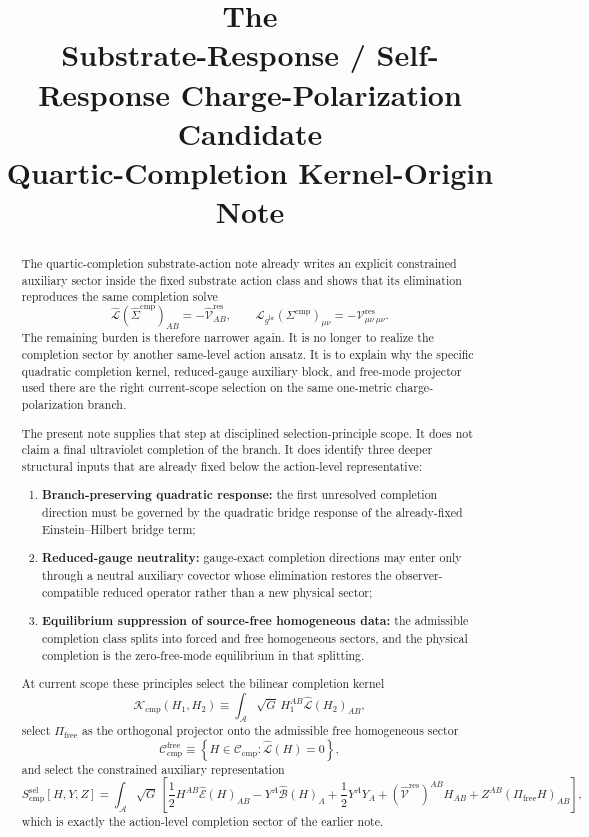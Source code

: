 \documentclass[11pt]{article}
\title{\textbf{The \TheoryName{}}\\[0.4em]
\large Substrate-Response / Self-Response Charge-Polarization Candidate\\
\large Quartic-Completion Kernel-Origin Note}
\author{}
\date{}
\newcommand{\Sub}{\mathcal A}
\newcommand{\ObserverMetric}{g^{\mathrm{br}}}
\newcommand{\CompShift}{\Sigma^{\mathrm{cmp}}}
\newcommand{\CompLift}{\widehat\Sigma^{\mathrm{cmp}}}
\newcommand{\ResidualCore}{\mathcal V_{\mu\nu}^{\mathrm{res}}}
\newcommand{\ResidualLift}{\widehat{\mathcal V}^{\mathrm{res}}}
\newcommand{\SubEinLin}{\widehat{\mathcal E}}
\newcommand{\SubGaugeVec}{\widehat{\mathcal B}}
\newcommand{\SubReducedEin}{\widehat{\mathcal L}}
\newcommand{\FreeProj}{\Pi_{\mathrm{free}}}
\newcommand{\GaugeAux}{Y}
\newcommand{\ModeAux}{Z}
\newcommand{\ReducedEin}{\mathcal L_{\ObserverMetric}}
\newcommand{\CompClass}{\mathscr C_{\mathrm{cmp}}}
\newcommand{\CompFree}{\mathscr C_{\mathrm{cmp}}^{\mathrm{free}}}
\newcommand{\CompKernel}{\mathscr K_{\mathrm{cmp}}}
\newcommand{\CompSelectAction}{S_{\mathrm{cmp}}^{\mathrm{sel}}}
\begin{document}
\maketitle

\begin{abstract}
The quartic-completion substrate-action note already writes an explicit constrained auxiliary sector inside the fixed substrate action class and shows that its elimination reproduces the same completion solve
\[
\SubReducedEin(\CompLift)_{AB}=-\ResidualLift_{AB},
\qquad
\ReducedEin(\CompShift)_{\mu\nu}=-\ResidualCore{}_{\mu\nu}.
\]
The remaining burden is therefore narrower again. It is no longer to realize the completion sector by another same-level action ansatz. It is to explain why the specific quadratic completion kernel, reduced-gauge auxiliary block, and free-mode projector used there are the right current-scope selection on the same one-metric charge-polarization branch.

The present note supplies that step at disciplined selection-principle scope. It does not claim a final ultraviolet completion of the branch. It does identify three deeper structural inputs that are already fixed below the action-level representative:
\begin{enumerate}
    \item \textbf{Branch-preserving quadratic response:} the first unresolved completion direction must be governed by the quadratic bridge response of the already-fixed Einstein--Hilbert bridge term;
    \item \textbf{Reduced-gauge neutrality:} gauge-exact completion directions may enter only through a neutral auxiliary covector whose elimination restores the observer-compatible reduced operator rather than a new physical sector;
    \item \textbf{Equilibrium suppression of source-free homogeneous data:} the admissible completion class splits into forced and free homogeneous sectors, and the physical completion is the zero-free-mode equilibrium in that splitting.
\end{enumerate}
At current scope these principles select the bilinear completion kernel
\[
\CompKernel(H_1,H_2)
\equiv
\int_{\Sub}\sqrt{G}\,H_1^{AB}\SubReducedEin(H_2)_{AB},
\]
select \(\FreeProj\) as the orthogonal projector onto the admissible free homogeneous sector
\[
\CompFree
\equiv
\left\{
H\in\CompClass:\SubReducedEin(H)=0
\right\},
\]
and select the constrained auxiliary representation
\[
\CompSelectAction[H,\GaugeAux,\ModeAux]
=
\int_{\Sub}\sqrt{G}\,
\left[
\frac12 H^{AB}\SubEinLin(H)_{AB}
-\GaugeAux^A\SubGaugeVec(H)_A
+\frac12 \GaugeAux^A\GaugeAux_A
+(\ResidualLift)^{AB}H_{AB}
+\ModeAux^{AB}(\FreeProj H)_{AB}
\right],
\]
which is exactly the action-level completion sector of the earlier note.


\end{abstract}
\end{document}
